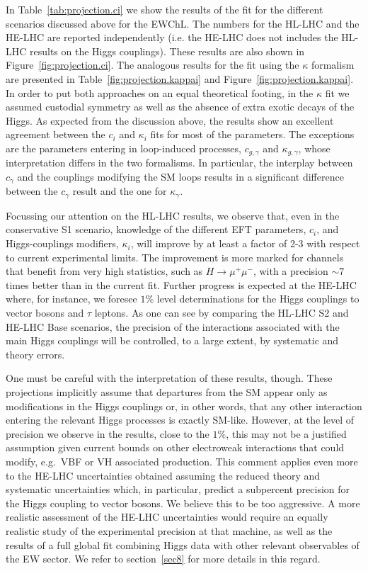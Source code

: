 In Table~\ref{tab:projection.ci} we show the results of the fit for the different scenarios discussed above for the EWChL. The numbers for the HL-LHC and the HE-LHC are reported independently (i.e. the HE-LHC does not includes the HL-LHC results on the Higgs couplings). %
These results are also shown in Figure~\ref{fig:projection.ci}. 
The analogous results for the fit using the $\kappa$ formalism are presented in Table~\ref{fig:projection.kappai} and Figure~\ref{fig:projection.kappai}. In order to put both approaches on an equal theoretical footing, in the $\kappa$ fit we assumed custodial symmetry as well as the absence of extra exotic decays of the Higgs.  As expected from the discussion above, the results show an excellent agreement between the $c_i$ and $\kappa_i$ fits for most of the parameters. The exceptions are the parameters entering in loop-induced processes, $c_{g,\gamma}$ and $\kappa_{g,\gamma}$, whose interpretation differs in the two formalisms. In particular, the interplay between $c_{\gamma}$ and the couplings modifying the SM loops results in a significant difference between the $c_\gamma$ result and the one for $\kappa_\gamma$.

Focussing our attention on the HL-LHC results, we observe that, even in the conservative S1 scenario, knowledge of the different EFT parameters, $c_i$, and Higgs-couplings modifiers, $\kappa_i$, will improve by at least a factor of 2-3 with respect to current experimental limits. The improvement is more marked for channels that benefit from very high statistics, such as $H\to \mu^+ \mu^-$, with a precision $\sim 7$ times better than in the current fit. Further progress is expected at the HE-LHC where, for instance, we foresee
$1\%$ level determinations for the Higgs couplings to vector bosons and $\tau$ leptons.
As one can see by comparing the HL-LHC S2 and HE-LHC Base scenarios, the precision of the interactions associated with the main Higgs couplings 
will be controlled, to a large extent, by systematic and theory errors. 

One must be careful with the interpretation of these results, though. These projections implicitly assume that departures from the SM appear only as modifications in the Higgs couplings or, in other words, that any other interaction entering the relevant Higgs processes is exactly SM-like. However, at the level of precision we observe in the results, close to the $1\%$, this may not be a justified assumption given current bounds on other electroweak interactions that could modify, e.g.~VBF or VH associated production. This comment applies even more to the HE-LHC uncertainties obtained assuming the reduced theory and systematic uncertainties which, in particular, predict a subpercent precision for the Higgs coupling to vector bosons. We believe this to be too aggressive. A more realistic assessment of the HE-LHC uncertainties would require an equally realistic study of the experimental precision at that machine, as well as the results of a full global fit combining Higgs data with other relevant observables of the EW sector. We refer to section~\ref{sec8} for more details in this regard.

